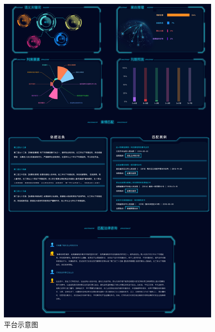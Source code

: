 \begin{figure}[ht]
	\centering
    \includegraphics[width=\linewidth]{figures/demo_use/page_2}
    \caption{平台示意图}
    \label{fig:demo_page2}
\end{figure}
